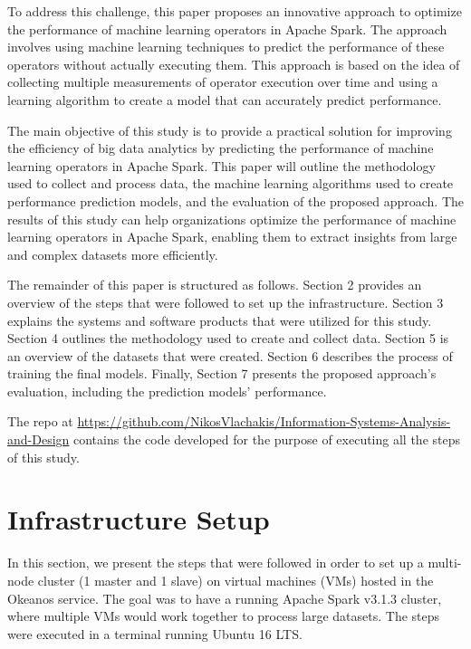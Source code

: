 \documentclass[conference]{IEEEtran}
\begin{document}
To address this challenge, this paper proposes an innovative approach to optimize the performance of machine learning operators in Apache Spark. The approach involves using machine learning techniques to predict the performance of these operators without actually executing them. This approach is based on the idea of collecting multiple measurements of operator execution over time and using a learning algorithm to create a model that can accurately predict performance.

The main objective of this study is to provide a practical solution for improving the efficiency of big data analytics by predicting the performance of machine learning operators in Apache Spark. This paper will outline the methodology used to collect and process data, the machine learning algorithms used to create performance prediction models, and the evaluation of the proposed approach. The results of this study can help organizations optimize the performance of machine learning operators in Apache Spark, enabling them to extract insights from large and complex datasets more efficiently.

The remainder of this paper is structured as follows. Section 2 provides an overview of the steps that were followed to set up the infrastructure. Section 3 explains the systems and software products that were utilized for this study. Section 4 outlines the methodology used to create and collect data. Section 5 is an overview of the datasets that were created. Section 6 describes the process of training the final models. Finally, Section 7 presents the proposed approach's evaluation, including the prediction models' performance.

The repo at \url{https://github.com/NikosVlachakis/Information-Systems-Analysis-and-Design} contains the code developed for the purpose of executing all the steps of this study.



\section{Infrastructure Setup}

In this section, we present the steps that were followed in order to set up a multi-node cluster (1 master and 1 slave) on virtual machines (VMs) hosted in the Okeanos service. The goal was to have a running Apache Spark v3.1.3 cluster, where multiple VMs would work together to process large datasets. The steps were executed in a terminal running Ubuntu 16 LTS.
\end{document}
